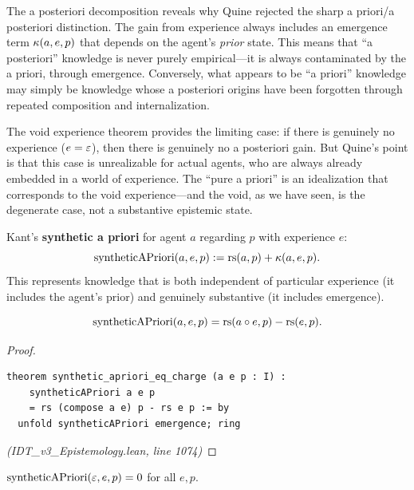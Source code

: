 \begin{interpretation}
The a posteriori decomposition reveals why Quine rejected the sharp
a priori/a posteriori distinction. The gain from experience always includes
an emergence term $\kappa(a, e, p)$ that depends on the agent's \emph{prior}
state. This means that ``a posteriori'' knowledge is never purely empirical---it
is always contaminated by the a priori, through emergence. Conversely, what
appears to be ``a priori'' knowledge may simply be knowledge whose a posteriori
origins have been forgotten through repeated composition and internalization.

The void experience theorem provides the limiting case: if there is genuinely
no experience ($e = \varepsilon$), then there is genuinely no a posteriori gain. But
Quine's point is that this case is unrealizable for actual agents, who are
always already embedded in a world of experience. The ``pure a priori'' is an
idealization that corresponds to the void experience---and the void, as we have
seen, is the degenerate case, not a substantive epistemic state.
\end{interpretation}

\begin{definition}
\label{def:synthetic-apriori}
Kant's \textbf{synthetic a priori} for agent $a$ regarding $p$ with experience $e$:
\[
  \mathrm{syntheticAPriori}(a, e, p) := \mathrm{rs}(a, p) + \kappa(a, e, p).
\]
This represents knowledge that is both independent of particular experience (it
includes the agent's prior) and genuinely substantive (it includes emergence).
\end{definition}

\begin{theorem}
\label{thm:synthetic-apriori-eq}
\[
  \mathrm{syntheticAPriori}(a, e, p) = \mathrm{rs}(a \circ e, p) - \mathrm{rs}(e, p).
\]
\end{theorem}

\begin{proof}
\begin{lstlisting}
theorem synthetic_apriori_eq_charge (a e p : I) :
    syntheticAPriori a e p
    = rs (compose a e) p - rs e p := by
  unfold syntheticAPriori emergence; ring
\end{lstlisting}
\textit{(IDT\_v3\_Epistemology.lean, line 1074)}
\end{proof}

\begin{theorem}
\label{thm:void-no-synthetic}
$\mathrm{syntheticAPriori}(\varepsilon, e, p) = 0$ for all $e, p$.
\end{theorem}

